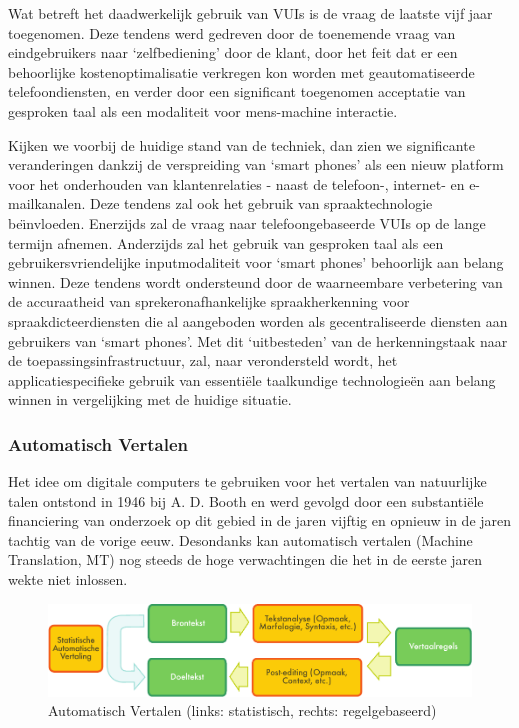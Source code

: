 \documentclass[]{../../metanetpaper}
\begin{document}
\begin{multicols}{2}
    Wat betreft het daadwerkelijk gebruik van VUIs is de vraag de laatste vijf jaar toegenomen. Deze tendens werd gedreven door de toenemende vraag van eindgebruikers naar `zelfbediening' door de klant, door het feit dat er een behoorlijke kostenoptimalisatie verkregen kon worden met geautomatiseerde telefoondiensten, en verder door een significant toegenomen acceptatie van gesproken taal als een modaliteit voor mens-machine interactie.

    Kijken we voorbij de huidige stand van de techniek, dan zien we significante veranderingen dankzij de verspreiding van `smart phones' als een nieuw platform voor het onderhouden van klantenrelaties - naast de telefoon-, internet- en e-mailkanalen. Deze tendens zal ook het gebruik van spraaktechnologie be{\"\i}nvloeden. Enerzijds zal de vraag naar telefoongebaseerde VUIs op de lange termijn afnemen. Anderzijds zal het gebruik van gesproken taal als een gebruikersvriendelijke inputmodaliteit voor `smart phones' behoorlijk aan belang winnen. Deze tendens wordt ondersteund door de waarneembare verbetering van de accuraatheid van sprekeronafhankelijke spraakherkenning voor spraakdicteerdiensten die al aangeboden worden als gecentraliseerde diensten aan gebruikers van `smart phones'. Met dit `uitbesteden' van de herkenningstaak naar de toepassingsinfrastructuur, zal, naar verondersteld wordt, het applicatiespecifieke gebruik van essenti{\"e}le taalkundige technologie{\"e}n aan belang winnen in vergelijking met de huidige situatie.

\subsubsection{Automatisch Vertalen}

  Het idee om digitale computers te gebruiken voor het vertalen van natuurlijke talen ontstond in 1946 bij A. D. Booth en werd gevolgd door een substanti{\"e}le financiering van onderzoek op dit gebied in de jaren vijftig en opnieuw in de jaren tachtig van de vorige eeuw. Desondanks kan automatisch vertalen (Machine Translation, MT) nog steeds de hoge verwachtingen die het in de eerste jaren wekte niet inlossen.

\begin{figure}[htb]
  \center
  \includegraphics[width=\textwidth]{../_media/dutch/machine_translation}
  \vspace{-2mm}
  \caption{Automatisch Vertalen (links: statistisch, rechts: regelgebaseerd)}
  \label{fig:mtarch_de}
\end{figure}


\end{multicols}
\end{document}
